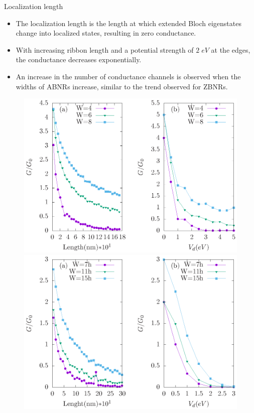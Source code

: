 \documentclass[handout,t]{beamer}
\begin{document}
\begin{frame}{Localization length}
	\begin{itemize}
		\item The localization length is the length at which extended Bloch eigenstates change into localized states, resulting in zero conductance.
		\item With increasing ribbon length and a potential strength of $2\;eV$ at the edges, the conductance decreases exponentially.
		\item An increase in the number of conductance channels is observed when the widths of ABNRs increase, similar to the trend observed for ZBNRs.
	\end{itemize}
	\begin{figure}[ht]
		\raggedleft
		\includegraphics[width=0.5\linewidth]{../figures/zigzag-width-strangth-thesis.eps}
		\includegraphics[width=0.5\linewidth]{../figures/armchair-width-strangth-thesis.eps}
	\end{figure}
\end{frame}
\end{document}
